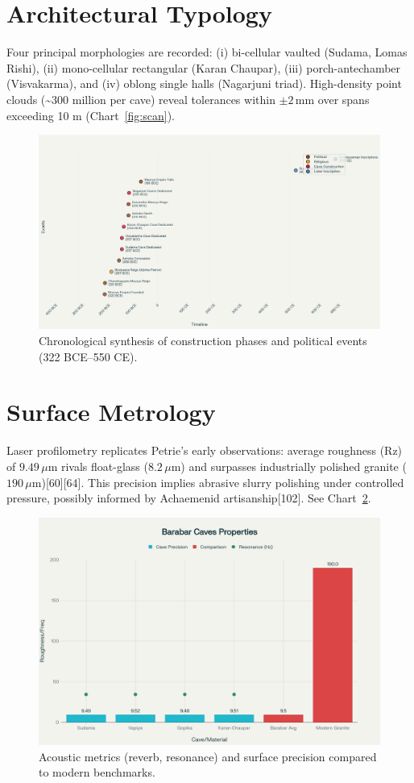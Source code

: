 \documentclass{article}
\begin{document}
\begin{multicols}{2}
\section{Architectural Typology}
Four principal morphologies are recorded: (i) bi-cellular vaulted (Sudama, Lomas Rishi), (ii) mono-cellular rectangular (Karan Chaupar), (iii) porch-antechamber (Visvakarma), and (iv) oblong single halls (Nagarjuni triad). High-density point clouds (\textasciitilde300 million per cave) reveal tolerances within \(\pm 2\,\mathrm{mm}\) over spans exceeding 10 m (Chart~\ref{fig:scan}).
\begin{figure}
\centering
\includegraphics[width=\linewidth]{barabar_caves_timeline.png}
\caption{Chronological synthesis of construction phases and political events (322 BCE–550 CE).}
\label{fig:timeline}
\end{figure}
\section{Surface Metrology}
Laser profilometry replicates Petrie’s early observations: average roughness (Rz) of \(9.49\,\mu\mathrm{m}\) rivals float-glass (\(8.2\,\mu\mathrm{m}\)) and surpasses industrially polished granite (\(190\,\mu\mathrm{m}\))[60][64]. This precision implies abrasive slurry polishing under controlled pressure, possibly informed by Achaemenid artisanship[102]. See Chart~\ref{fig:precision}.
\begin{figure}
\centering
\includegraphics[width=\columnwidth]{barabar_caves_complete.png}
\caption{Acoustic metrics (reverb, resonance) and surface precision compared to modern benchmarks.}
\label{fig:precision}
\end{figure}

\end{multicols}
\end{document}
